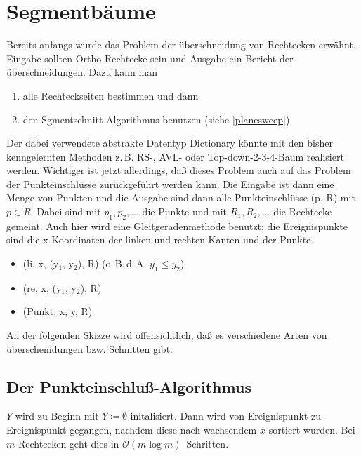 \documentclass[ngerman,draft,parskip=half*,twoside]{scrreprt}
\theoremstyle{break}
\theoremstyle{nonumberbreak}
\newcommand*{\OO}{\mathcal{O}}      %
\begin{document}
\section{Segmentbäume}
Bereits anfangs wurde das Problem der überschneidung von Rechtecken erwähnt. Eingabe sollten Ortho-Rechtecke sein und Ausgabe ein
Bericht der überschneidungen. Dazu kann man
\begin{enumerate}
\item alle Rechteckseiten bestimmen und dann
\item den Sgmentschnitt-Algorithmus benutzen (siehe \autoref{planesweep})
\end{enumerate}

Der dabei verwendete abstrakte Datentyp Dictionary könnte mit den bisher kenngelernten Methoden z.\,B. RS-, AVL- oder
Top-down-2-3-4-Baum realisiert werden.
Wichtiger ist jetzt allerdings, daß dieses Problem auch auf das Problem der Punkteinschlüsse zurückgeführt werden kann. Die Eingabe
ist dann eine Menge von Punkten und die Ausgabe sind dann alle Punkteinschlüsse (p, R) mit $p  \in  R$. Dabei sind mit $p_1,   p_2,
  \ldots$ die Punkte und mit $R_1,   R_2,   \ldots$ die Rechtecke gemeint. Auch hier wird eine Gleitgeradenmethode benutzt; die
Ereignispunkte sind die x-Koordinaten der linken und rechten Kanten und der Punkte.
\begin{itemize}
\item[] (li, x, (y$_1$, y$_2$), R) \hspace{2cm} (o.\,B.\,d.\,A. $y_1 \leq y_2$)
\item[] (re, x, (y$_1$, y$_2$), R)
\item[] (Punkt, x, y, R)
\end{itemize}

An der folgenden Skizze wird offensichtlich, daß es verschiedene Arten von überschenidungen bzw. Schnitten gibt. 
\begin{figure}[H]
\centering


\end{figure}

\subsection{Der Punkteinschluß-Algorithmus}
$Y$ wird zu Beginn  mit $Y\coloneqq \emptyset$ initalisiert. Dann wird von Ereignispunkt zu Ereignispunkt gegangen, nachdem diese nach wachsendem
$x$ sortiert wurden. Bei $m$ Rechtecken geht dies in $\OO(m\log m)$~Schritten.
\end{document}
